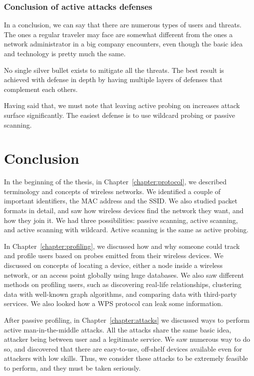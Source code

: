 \documentclass[12pt,a4paper,oneside,pdftex]{report}
\begin{document}
\subsection{Conclusion of active attacks defenses}

In a conclusion, we can say that there are numerous types of users and threats. The ones a regular traveler may face are somewhat different from the ones a network administrator in a big company encounters, even though the basic idea and technology is pretty much the same.

No single silver bullet exists to mitigate all the threats. The best result is achieved with defense in depth by having multiple layers of defenses that complement each others.

Having said that, we must note that leaving active probing on increases attack surface significantly. The easiest defense is to use wildcard probing or passive scanning.




\chapter{Conclusion}
\label{chapter:conclusion}

In the beginning of the thesis, in Chapter~\ref{chapter:protocol}, we described terminology and concepts of wireless networks. We identified a couple of important identifiers, the MAC address and the SSID. We also studied packet formats in detail, and saw how wireless devices find the network they want, and how they join it. We had three possibilities: passive scanning, active scanning, and active scanning with wildcard. Active scanning is the same as active probing.

In Chapter~\ref{chapter:profiling}, we discussed how and why someone could track and profile users based on probes emitted from their wireless devices. We discussed on concepts of locating a device, either a node inside a wireless network, or an access point globally using huge databases. We also saw different methods on profiling users, such as discovering real-life relationships, clustering data with well-known graph algorithms, and comparing data with third-party services. We also looked how a WPS protocol can leak some information.

After passive profiling, in Chapter~\ref{chapter:attacks} we discussed ways to perform active man-in-the-middle attacks. All the attacks share the same basic idea, attacker being between user and a legitimate service. We saw numerous way to do so, and discovered that there are easy-to-use, off-shelf devices available even for attackers with low skills. Thus, we consider these attacks to be extremely feasible to perform, and they must be taken seriously.
\end{document}
